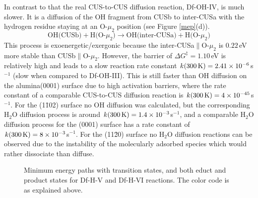 \documentclass[11pt,DIV=13,BCOR=5mm,a4paper,headinclude]{scrbook}
\begin{document}
In contrast to that the real CUS-to-CUS diffusion reaction, Df-OH-IV, is much slower.
It is a diffusion of the OH fragment from CUSb to inter-CUSa with the hydrogen residue staying at an O-$\mu_2$ position (see Figure \ref{mep}(d)).
\begin{equation}
 \text{OH(CUSb)} + \text{H(O-$\mu_2$)} \rightarrow \text{OH(inter-CUSa)} + \text{H(O-$\mu_2$)} \tag{Df-OH-IV}
     \label{diffOHIV}
\end{equation}
This process is exoenergetic/exergonic because the inter-CUSa$\parallel$O-$\mu_2$ is $0.22\,$eV more stable than CUSb$\parallel$O-$\mu_2$.
However, the barrier of $\Delta G^\ddagger=1.10\,$eV is relatively high and leads to a slow reaction rate constant $k(\textrm{300\,K})=2.41\times 10^{-6}$s$^{-1}$ (slow when compared to Df-OH-III).
This is still faster than OH diffusion on the alumina(0001) surface\cite{WirthJPCC2012,Wirth2014thesis} due to high activation barriers, where the rate constant of a comparable CUS-to-CUS diffusion reaction is $k(\textrm{300\,K})=4\times 10^{-45}$s$^{-1}$.
For the (1\=102) surface no OH diffusion was calculated, but the corresponding H$_2$O diffusion process is around $k(\textrm{300\,K})=1.4\times 10^{-3}$s$^{-1}$, and a comparable H$_2$O diffusion process for the (0001) surface has a rate constant of $k(\textrm{300\,K})=8\times 10^{-3}$s$^{-1}$.
For the (11\=20) surface no H$_2$O diffusion reactions can be observed due to the instability of the molecularly adsorbed species which would rather dissociate than diffuse.
\begin{figure} [!h]
\centering
{}
 \quad
{}
\caption{Minimum energy paths with transition states, and both educt and product states for Df-H-V and Df-H-VI reactions.
The color code is as explained above.}
       \label{mep2}
\end{figure}
\end{document}
